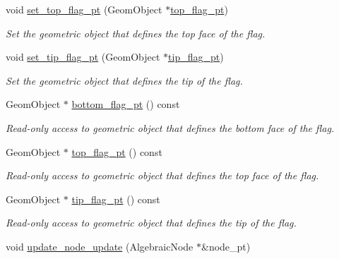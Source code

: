 \begin{DoxyCompactItemize}
void \hyperlink{classoomph_1_1AlgebraicCylinderWithFlagMesh_a9d7f04acdaed3e9f2133d9665dd4b799}{set\+\_\+top\+\_\+flag\+\_\+pt} (Geom\+Object $\ast$\hyperlink{classoomph_1_1AlgebraicCylinderWithFlagMesh_a06bc13adad4aaa037d989bba9e3bf79d}{top\+\_\+flag\+\_\+pt})
\begin{DoxyCompactList}\small\item\em Set the geometric object that defines the top face of the flag. \end{DoxyCompactList}\item 
void \hyperlink{classoomph_1_1AlgebraicCylinderWithFlagMesh_a191d736d9acbeb5927fc5f472420e9f6}{set\+\_\+tip\+\_\+flag\+\_\+pt} (Geom\+Object $\ast$\hyperlink{classoomph_1_1AlgebraicCylinderWithFlagMesh_ad6d22aaa02d79e3c740b06d98a1597ea}{tip\+\_\+flag\+\_\+pt})
\begin{DoxyCompactList}\small\item\em Set the geometric object that defines the tip of the flag. \end{DoxyCompactList}\item 
Geom\+Object $\ast$ \hyperlink{classoomph_1_1AlgebraicCylinderWithFlagMesh_a9c362fcc5edeb1b6e773f27a83778495}{bottom\+\_\+flag\+\_\+pt} () const
\begin{DoxyCompactList}\small\item\em Read-\/only access to geometric object that defines the bottom face of the flag. \end{DoxyCompactList}\item 
Geom\+Object $\ast$ \hyperlink{classoomph_1_1AlgebraicCylinderWithFlagMesh_a06bc13adad4aaa037d989bba9e3bf79d}{top\+\_\+flag\+\_\+pt} () const
\begin{DoxyCompactList}\small\item\em Read-\/only access to geometric object that defines the top face of the flag. \end{DoxyCompactList}\item 
Geom\+Object $\ast$ \hyperlink{classoomph_1_1AlgebraicCylinderWithFlagMesh_ad6d22aaa02d79e3c740b06d98a1597ea}{tip\+\_\+flag\+\_\+pt} () const
\begin{DoxyCompactList}\small\item\em Read-\/only access to geometric object that defines the tip of the flag. \end{DoxyCompactList}\item 
void \hyperlink{classoomph_1_1AlgebraicCylinderWithFlagMesh_a9d909de1db84a3b7e42494535b152d92}{update\+\_\+node\+\_\+update} (Algebraic\+Node $\ast$\&node\+\_\+pt)

\end{DoxyCompactItemize}

